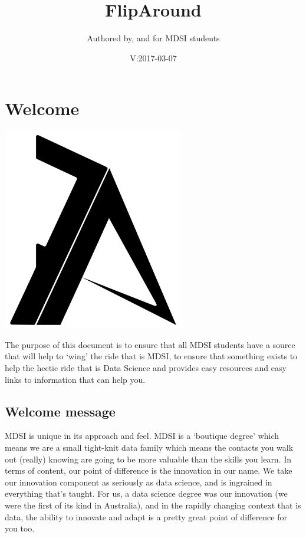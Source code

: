 \documentclass[]{book}
\title{FlipAround}
\author{Authored by, and for MDSI students}
\date{V:2017-03-07}
\theoremstyle{definition}
\theoremstyle{definition}
\theoremstyle{remark}
\begin{document}
\maketitle

{
\setcounter{tocdepth}{1}
\tableofcontents
}
\chapter{Welcome}\label{welcome}

\includegraphics{Images/FAlogo.png}

The purpose of this document is to ensure that all MDSI students have a
source that will help to `wing' the ride that is MDSI, to ensure that
something exists to help the hectic ride that is Data Science and
provides easy resources and easy links to information that can help you.

\section{Welcome message}\label{welcome-message}

MDSI is unique in its approach and feel. MDSI is a `boutique degree'
which means we are a small tight-knit data family which means the
contacts you walk out (really) knowing are going to be more valuable
than the skills you learn. In terms of content, our point of difference
is the innovation in our name. We take our innovation component as
seriously as data science, and is ingrained in everything that's taught.
For us, a data science degree was our innovation (we were the first of
its kind in Australia), and in the rapidly changing context that is
data, the ability to innovate and adapt is a pretty great point of
difference for you too.
\end{document}
